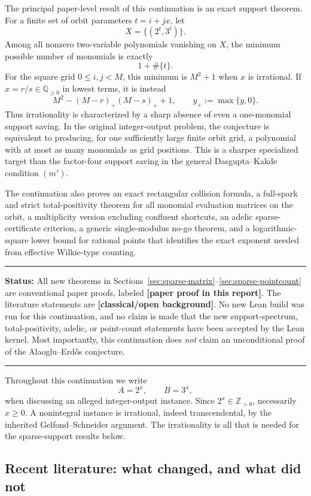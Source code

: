 \documentclass[11pt,oneside]{article}
\theoremstyle{definition}
\theoremstyle{remark}
\newcommand{\Z}{\mathbb Z}
\newcommand{\Q}{\mathbb Q}
\newcommand{\statusnew}{\textcolor{newgreen}{\textbf{[paper proof in this report]}}}
\newcommand{\statusknown}{\textcolor{classicalgray}{\textbf{[classical/\allowbreak open background]}}}
\newenvironment{statusbox}[1]
{\begin{center}\begin{minipage}{0.94\textwidth}\raggedright\hbadness=10000\hrule
\vspace{0.45em}\textbf{Status:} #1\par\vspace{0.35em}}
{\vspace{0.35em}\hrule\end{minipage}\end{center}}
\begin{document}
The principal paper-level result of this continuation is an exact support theorem.  For a
finite set of orbit parameters $t=i+jx$, let
\[
  X=\{(2^t,3^t)\}.
\]
Among all nonzero two-variable polynomials vanishing on $X$, the minimum possible number of
monomials is exactly
\[
  1+\#\{t\}.
\]
For the square grid $0\le i,j<M$, this minimum is $M^2+1$ when $x$ is irrational.  If
$x=r/s\in\Q_{\ge0}$ in lowest terms, it is instead
\[
  M^2-(M-r)_+(M-s)_++1,
  \qquad y_+:=\max\{y,0\}.
\]
Thus irrationality is characterized by a sharp absence of even a one-monomial support
saving.  In the original integer-output problem, the conjecture is equivalent to producing,
for one sufficiently large finite orbit grid, a polynomial with at most as many monomials as
grid positions.  This is a sharper specialized target than the factor-four support saving in
the general Dasgupta--Kakde condition $(m')$.

The continuation also proves an exact rectangular collision formula, a full-spark and strict
total-positivity theorem for all monomial evaluation matrices on the orbit, a multiplicity
version excluding confluent shortcuts, an adelic sparse-certificate criterion, a generic
single-modulus no-go theorem, and a logarithmic-square lower bound for rational points that
identifies the exact exponent needed from effective Wilkie-type counting.

\begin{statusbox}{All new theorems in Sections~\ref{sec:sparse-matrix}--\ref{sec:sparse-pointcount}
are conventional paper proofs, labeled \statusnew.  The literature statements are
\statusknown.  No new Lean build was run for this continuation, and no claim is made that the
new support-spectrum, total-positivity, adelic, or point-count statements have been accepted
by the Lean kernel.  Most importantly, this continuation does \emph{not} claim an
unconditional proof of the Alaoglu--Erd\H{o}s conjecture.}
\end{statusbox}

Throughout this continuation we write
\[
  A=2^x,\qquad B=3^x,
\]
when discussing an alleged integer-output instance.  Since $2^x\in\Z_{>0}$, necessarily
$x\ge0$.  A nonintegral instance is irrational, indeed transcendental, by the inherited
Gelfond--Schneider argument.  The irrationality is all that is needed for the sparse-support
results below.

\subsection{Recent literature: what changed, and what did not}
\label{sec:sparse-literature}
\end{document}
